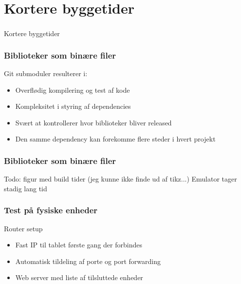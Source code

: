 \section[Kortere byggetider]{Kortere byggetider}

\begin{frame}
  \frametitle{}
  \begin{center}
    {\Huge Kortere byggetider}
  \end{center}
\end{frame}

\begin{frame}
    \frametitle{Biblioteker som binære filer}
	Git submoduler resulterer i:
    \begin{itemize}
        \item Overflødig kompilering og test af kode
        \item Kompleksitet i styring af dependencies
        \item Svært at kontrollerer hvor biblioteker bliver released
        \item Den samme dependency kan forekomme flere steder i hvert projekt
    \end{itemize}
\end{frame}

\begin{frame}
    \frametitle{Biblioteker som binære filer}
    Todo: figur med build tider (jeg kunne ikke finde ud af tikz...)
    Emulator tager stadig lang tid
\end{frame}

\begin{frame}
    \frametitle{Test på fysiske enheder}
    Router setup
    \begin{itemize}
        \item Fast IP til tablet første gang der forbindes
        \item Automatisk tildeling af porte og port forwarding
        \item Web server med liste af tilsluttede enheder
    \end{itemize}
\end{frame}

